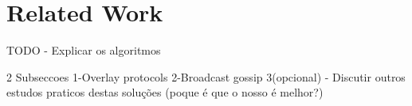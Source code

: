 \section{Related Work}
TODO - Explicar os algoritmos

2 Subseccoes
    1-Overlay protocols
    2-Broadcast gossip
    3(opcional) - Discutir outros estudos praticos destas soluções (poque é que o nosso é melhor?)